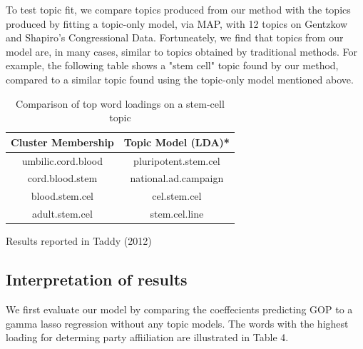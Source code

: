 \documentclass[12pt]{article}
\begin{document}
To test topic fit, we compare topics produced from our method with the topics produced by fitting a topic-only model, via MAP, with 12 topics on Gentzkow and Shapiro's Congressional Data. Fortuneately, we find that topics from our model are, in many cases, similar to topics obtained by traditional methods. For example, the following table shows a "stem cell" topic found by our method, compared to a similar topic found using the topic-only model mentioned above.

\begin{table}[!htbp]
\begin{threeparttable}
\caption{Comparison of top word loadings on a stem-cell topic} \label{tab:title}
\centering
\begin{tabular}{  c  c }
Cluster Membership & Topic Model (LDA)* \\
\hline
umbilic.cord.blood & pluripotent.stem.cel \\
cord.blood.stem  & national.ad.campaign \\
blood.stem.cel   & cel.stem.cel \\
adult.stem.cel & stem.cel.line \\
\end{tabular}
\begin{tablenotes}
\small
\item  *Results reported in Taddy (2012)
\end{tablenotes}
\end{threeparttable}
\end{table}

\subsection{Interpretation of results}

We first evaluate our model by comparing the coeffecients predicting GOP to a gamma lasso regression without any topic models. 
The words with the highest loading for determing party affiiliation are illustrated in Table 4. 
\end{document}
